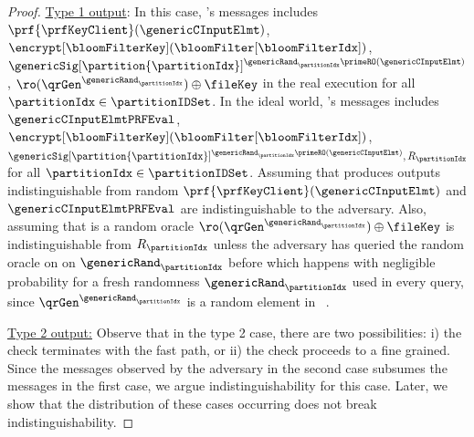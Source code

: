 \begin{proof}
\noindent \underline{Type 1 output}: In this case, \server's messages includes $ \prf{\prfKeyClient}(\genericCInputElmt)$, $\encrypt[\bloomFilterKey](\bloomFilter[\bloomFilterIdx])$, $\genericSig[\partition{\partitionIdx}]^{\genericRand_\partitionIdx \primeRO(\genericCInputElmt)}$, $\ro(\qrGen^{\genericRand_\partitionIdx}) \oplus \fileKey $ in the real execution for all $\partitionIdx \in \partitionIDSet$. In the ideal world, \server's messages includes $\genericCInputElmtPRFEval$, $\encrypt[\bloomFilterKey](\bloomFilter[\bloomFilterIdx])$, $\genericSig[\partition{\partitionIdx}]^{\genericRand_\partitionIdx \primeRO(\genericCInputElmt)}, R_\partitionIdx$ for all $\partitionIdx \in \partitionIDSet$. Assuming that \prf produces outputs indistinguishable from random  $ \prf{\prfKeyClient}(\genericCInputElmt)$ and $\genericCInputElmtPRFEval$ are indistinguishable to the adversary. Also, assuming that \ro is a random oracle $\ro(\qrGen^{\genericRand_\partitionIdx}) \oplus \fileKey $ is indistinguishable from $R_\partitionIdx$ unless the adversary has queried the random oracle on \ro on $\genericRand_\partitionIdx$ before which happens with negligible probability for a fresh randomness $\genericRand_\partitionIdx$ used in every query, since $\qrGen^{\genericRand_\partitionIdx}$ is a random element in \qrGroup~\cite{cramer2000signature}.  

\smallskip\noindent\underline{Type 2 output:} Observe that in the type 2 case, there are two possibilities: i) the check terminates with the fast path, or ii) the check proceeds to a fine grained. Since the messages observed by the adversary in the second case subsumes the messages in the first case, we argue indistinguishability for this case. Later, we show that the distribution of these cases occurring does not break indistinguishability. 


\end{proof}
